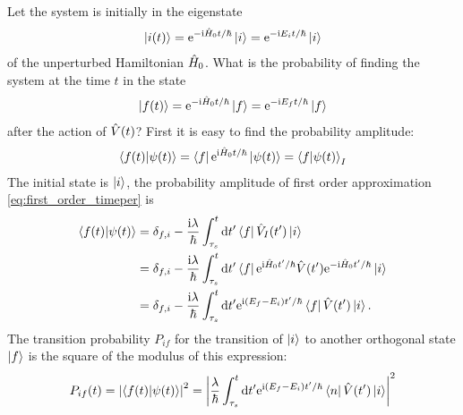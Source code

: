 Let the system is initially in the eigenstate
\begin{align}
    \ket{i(t)} = \mathrm{e}^{- \mathrm{i} \hat{H}_0 t/\hbar} \ket{i} = \mathrm{e}^{-\mathrm{i} E_i t/\hbar} \ket{i}
\end{align}
of the unperturbed Hamiltonian $\hat{H}_0$. What is the probability of finding the system at the time $t$ in the state 
\begin{align}
    \ket{f(t)} = \mathrm{e}^{-\mathrm{i} \hat{H}_0 t/\hbar} \ket{f} = \mathrm{e}^{-\mathrm{i} E_f t/\hbar} \ket{f}
\end{align}
after the action of $\hat{V}(t)$? First it is easy to find the probability amplitude: 
\begin{align}
    \braket{f(t)|\psi(t)} = \bra{f} \mathrm{e}^{\mathrm{i} \hat{H}_0 t/\hbar} \ket{\psi(t)} = \braket{f|\psi(t)}_I
\end{align}
The initial state is $\ket{i}$, the probability amplitude of first order approximation \cref{eq:first_order_timeper} is 
\begin{align}
    \braket{f(t)|\psi(t)} &= \delta_{f,i} - \frac{\mathrm{i} \lambda}{\hbar} \int_{\tau_s}^{t} \mathrm{d} t' \bra{f} \hat{V}_I(t') \ket{i} \notag \\
    &= \delta_{f,i} - \frac{\mathrm{i} \lambda}{\hbar} \int_{\tau_s}^{t} \mathrm{d} t' \bra{f} \mathrm{e}^{\mathrm{i} \hat{H}_0 t' /\hbar} \hat{V}(t') \mathrm{e}^{- \mathrm{i} \hat{H}_0 t'/ \hbar} \ket{i} \notag \\ 
    &= \delta_{f,i} - \frac{\mathrm{i} \lambda}{\hbar} \int_{\tau_s}^{t} \mathrm{d} t' \mathrm{e}^{\mathrm{i} (E_f - E_i) t'/ \hbar} \bra{f} \hat{V}(t') \ket{i}.
\end{align}
The transition probability $P_{if}$ for the transition of $\ket i$ to another orthogonal state $\ket f$ is the square of the modulus of this expression: 
\begin{align}
    P_{if} (t) = \left| \braket{f(t)|\psi(t)} \right|^2 = \left| \frac{\lambda}{\hbar} \int_{\tau_s}^{t} \mathrm{d} t' \mathrm{e}^{\mathrm{i}(E_f-E_i)t'/\hbar} \bra{n} \hat{V}(t') \ket{i}  \right|^2 \label{eq:timedependent_transition_probability}
\end{align}

